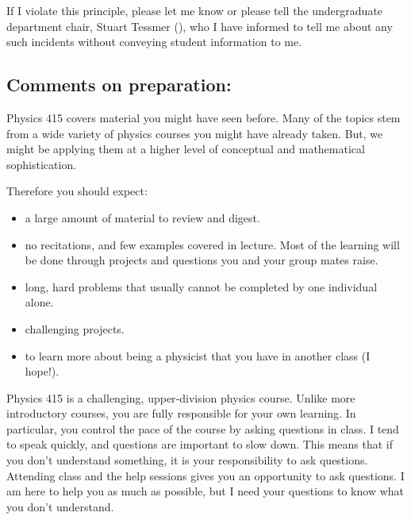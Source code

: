 \documentclass[letterpaper,10pt,english]{jupyterBook}
\begin{document}
\sphinxAtStartPar
{}

\sphinxAtStartPar
If I violate this principle, please let me know or please tell the undergraduate department chair, Stuart Tessmer (), who I have informed to tell me about any such incidents without conveying student information to me.


\subsection{Comments on preparation:}
\label{\detokenize{content/0_course/6_environment:comments-on-preparation}}
\sphinxAtStartPar
Physics 415 covers material you might have seen before. Many of the topics
stem from a wide variety of physics courses you might have already taken. But, we might be applying them at a higher level of conceptual and mathematical sophistication.

\sphinxAtStartPar
Therefore you should expect:
\begin{itemize}
\item {} 
\sphinxAtStartPar
a large amount of material to review and digest.

\item {} 
\sphinxAtStartPar
no recitations, and few examples covered in lecture. Most of the learning will be done through projects and questions you and your group mates raise.

\item {} 
\sphinxAtStartPar
long, hard problems that usually cannot be completed by one individual alone.

\item {} 
\sphinxAtStartPar
challenging projects.

\item {} 
\sphinxAtStartPar
to learn more about being a physicist that you have in another class (I hope!).

\end{itemize}

\sphinxAtStartPar
Physics 415 is a challenging, upper‐division physics course. Unlike more introductory courses, you are fully responsible for your own learning. In particular, you control the pace of the course by asking questions in class. I tend to speak quickly, and questions are important to slow down. This means that if you don’t understand something, it is your responsibility to ask questions. Attending class and the help sessions gives you an opportunity to ask questions. I am here to help you as much as possible, but I need your questions to know what you don’t understand.
\end{document}
